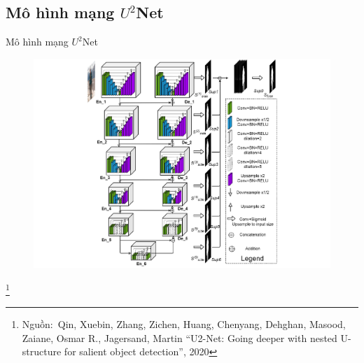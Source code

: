 \documentclass[
	10pt,                %
	aspectratio=169,     %
]{beamer}
\newcommand\footnotesource[1]{					%
	\vspace{-10mm}\let\thefootnote\relax\footnote{\hspace{-3mm}\tiny Nguồn:~#1}
}
\begin{document}
\subsection{Mô hình mạng $U^2$Net}
	\begin{frame}{Mô hình mạng $U^2$Net}
	\vspace{-0.7cm}
	\begin{figure}
		\centering
		\includegraphics[scale=0.35]{figures/u2net_arch.pdf}
	\end{figure}
	\footnotesource{Qin, Xuebin, Zhang, Zichen, Huang, Chenyang, Dehghan, Masood, Zaiane, Osmar R., Jagersand, Martin ``U2-Net: Going deeper with nested U-structure for salient object detection'', 2020} 
	\end{frame}
	
\end{document}
